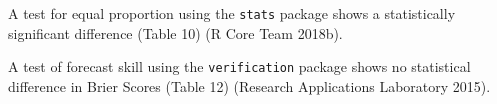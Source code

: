 \documentclass[]{article}
\newenvironment{Shaded}{\begin{snugshade}}{\end{snugshade}}
\newcommand{\CommentTok}[1]{\textcolor[rgb]{0.56,0.35,0.01}{\textit{#1}}}
\newcommand{\DataTypeTok}[1]{\textcolor[rgb]{0.13,0.29,0.53}{#1}}
\newcommand{\DecValTok}[1]{\textcolor[rgb]{0.00,0.00,0.81}{#1}}
\newcommand{\KeywordTok}[1]{\textcolor[rgb]{0.13,0.29,0.53}{\textbf{#1}}}
\newcommand{\NormalTok}[1]{#1}
\newcommand{\OperatorTok}[1]{\textcolor[rgb]{0.81,0.36,0.00}{\textbf{#1}}}
\newcommand{\StringTok}[1]{\textcolor[rgb]{0.31,0.60,0.02}{#1}}
\begin{document}
A test for equal proportion using the \texttt{stats} package shows a
statistically significant difference (Table 10) (R Core Team 2018b).

A test of forecast skill using the \texttt{verification} package shows
no statistical difference in Brier Scores (Table 12) (Research
Applications Laboratory 2015).

\begin{Shaded}
\end{Shaded}
\end{document}
